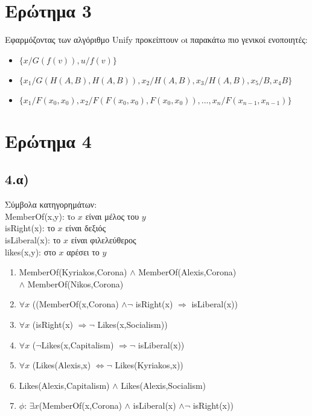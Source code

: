 \documentclass[12pt,a4paper]{article}
\begin{document}
\section*{Ερώτημα 3}
Εφαρμόζοντας των αλγόριθμο \textlatin{Unify} προκείπτουν oι παρακάτω πιο γενικοί ενοποιητές:
\begin{itemize}
\item $\{x/G(f(v)), u/f(v)\}$
\item $\{x_1/G(H(A,B),H(A,B)),x_2/H(A,B),x_3/H(A,B),x_5/B,x_4B \}$
\item $\{x_1/F(x_0,x_0),x_2/F(F(x_0,x_0),F(x_0,x_0)),...,x_n/F(x_{n-1},x_{n-1})\} $
\end{itemize}



\section*{Ερώτημα 4}
\subsection*{4.α)}
Σύμβολα κατηγορημάτων:\vspace{1mm}\\
\textlatin{MemberOf(x,y)}: τo $x$ είναι μέλος του $y$\\
\textlatin{isRight(x)}: το $x$ είναι δεξιός\\
\textlatin{isLiberal(x)}: το $x$ είναι φιλελεύθερος\\
\textlatin{likes(x,y)}: στο $x$ αρέσει το $y$
\begin{enumerate}[label = \roman*) ]
\item \textlatin{MemberOf(Kyriakos,Corona) $\wedge$ MemberOf(Alexis,Corona) \\ $ \wedge$ MemberOf(Nikos,Corona)}
\item \textlatin{$\forall x$ ((MemberOf(x,Corona) $\wedge \neg$ isRight(x) $\Rightarrow$ isLiberal(x))}
\item \textlatin{$\forall x$ (isRight(x) $\Rightarrow \neg$ Likes(x,Socialism)) }
\item \textlatin{$\forall x$ ($\neg$Likes(x,Capitalism) $\Rightarrow\neg$ isLiberal(x))}
\item \textlatin{$\forall x$ (Likes(Alexis,x) $\Leftrightarrow \neg$ Likes(Kyriakos,x))}
\item \textlatin{Likes(Alexis,Capitalism) $\wedge$ Likes(Alexis,Socialism)}
\item \textlatin{$\phi$: $\exists x$(MemberOf(x,Corona) $\wedge$ isLiberal(x) $\wedge\neg$ isRight(x))}
\end{enumerate} 
\end{document}
